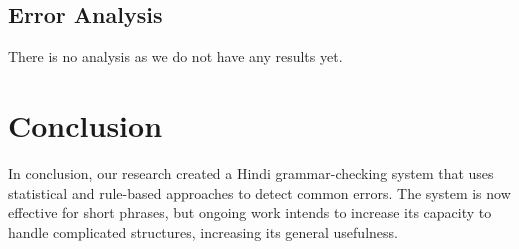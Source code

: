 \documentclass[11pt,a4paper]{article}
\begin{document}
\subsection{Error Analysis}
There is no analysis as we do not have any results yet.

\section{Conclusion}
In conclusion, our research created a 
Hindi grammar-checking system that uses statistical and rule-based approaches to detect common errors. The system is now effective for short phrases, but ongoing work intends to increase its capacity to handle complicated structures, increasing its general usefulness.



\end{document}
